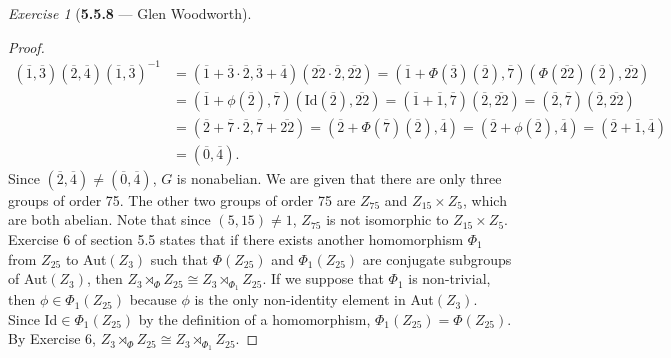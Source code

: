\documentclass[12pt]{amsart}
\theoremstyle{remark}
\newtheorem*{exercise}{Exercise}%
\theoremstyle{mycomment}
\begin{document}
\begin{exercise}[\textbf{5.5.8} --- Glen Woodworth]
\begin{proof}
\begin{align*}
(\overline{1},\overline{3})(\overline{2},\overline{4})(\overline{1},\overline{3})^{-1}&=(\overline{1}+\overline{3}\cdot\overline{2},\overline{3}+\overline{4})(\overline{22}\cdot\overline{2},\overline{22})=(\overline{1}+\Phi(\overline{3})(\overline{2}),\overline{7})(\Phi(\overline{22})(\overline{2}),\overline{22})\\
&=(\overline{1}+\phi(\overline{2}),\overline{7})(\text{Id}(\overline{2}),\overline{22})=(\overline{1}+\overline{1},\overline{7})(\overline{2},\overline{22})=(\overline{2},\overline{7})(\overline{2},\overline{22})\\
&=(\overline{2}+\overline{7}\cdot\overline{2},\overline{7}+\overline{22})=(\overline{2}+\Phi(\overline{7})(\overline{2}),\overline{4})=(\overline{2}+\phi(\overline{2}),\overline{4})=(\overline{2}+\overline{1},\overline{4})\\
&=(\overline{0},\overline{4}).
\end{align*}
Since $(\overline{2},\overline{4})\ne(\overline{0},\overline{4})$, $G$ is nonabelian. We are given that there are only three groups of order 75. The other two groups of order 75 are $Z_{75}$ and $Z_{15}\times Z_{5}$, which are both abelian. Note that since $(5,15)\ne 1$, $Z_{75}$ is not isomorphic to $Z_{15}\times Z_{5}$. Exercise 6 of section 5.5 states that if there exists another homomorphism $\Phi_1$ from $Z_{25}$ to Aut$(Z_3)$ such that $\Phi(Z_{25})$ and $\Phi_1(Z_{25})$ are conjugate subgroups of Aut$(Z_3)$, then $Z_3\rtimes_{\Phi}Z_{25}\cong Z_3\rtimes_{\Phi_1}Z_{25}.$ If we suppose that $\Phi_1$ is non-trivial, then $\phi\in\Phi_1(Z_{25})$ because $\phi$ is the only non-identity element in Aut$(Z_3)$. Since Id$\in\Phi_1(Z_{25})$ by the definition of a homomorphism, $\Phi_1(Z_{25})=\Phi(Z_{25})$. By Exercise 6, $Z_3\rtimes_{\Phi}Z_{25}\cong Z_3\rtimes_{\Phi_1}Z_{25}.$
  \end{proof}
\end{exercise}
\vspace{.15in}
\end{document}
